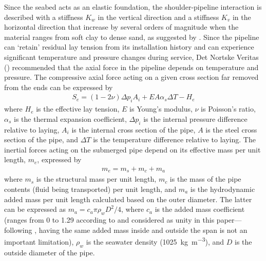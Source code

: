 \documentclass[3p,doublespacing,authoryear,11pt]{elsarticle} %
\begin{document}
Since the seabed acts as an elastic foundation, the shoulder-pipeline interaction is described with a stiffness $K_w$ in the vertical direction and a stiffness $K_v$ in the horizontal direction that increase by several orders of magnitude when the material ranges from soft clay to dense sand, as suggested by \cite{Hobbs86}. Since the pipeline can `retain' residual lay tension from its installation history and can experience significant temperature and pressure changes during service, Det Nortske Veritas (\citeyear{DNV-RP-F105,DNV-OS-F101}) recommended that the axial force in the pipeline depends on temperature and pressure. The compressive axial force acting on a given cross section far removed from the ends can be expressed by 
 \begin{equation}\label{axial_force}
 \begin{array}{l } 
\displaystyle  S_e =  (1-2 \nu) \Delta p_i A_i  + E A \alpha_s \Delta T - H_e
  \end{array}  
\end{equation}
where $H_e$ is the effective lay tension, $E$ is Young's modulus, $\nu$ is Poisson's ratio, $\alpha_s$ is the thermal expansion coefficient, $ \Delta p_i $ is the internal pressure difference relative to laying, $A_i$ is the internal cross section of the pipe,  $A$ is the steel cross section of the pipe, and $\Delta T$ is the temperature difference relative to laying. The inertial forces acting on the submerged pipe depend on its effective mass per unit length, $m_e$, expressed by
 \begin{equation}\label{effective_mass}
 \begin{array}{l } 
\displaystyle  m_e = m_s + m_c + m_a
  \end{array}  
\end{equation}
where $m_s$ is the structural mass per unit length, $m_c$ is the mass of the pipe contents (fluid being transported) per unit length, and $m_a$ is the hydrodynamic added mass per unit length calculated based on the outer diameter.  The latter can be expressed as $m_a = c_a \pi \rho_w D^2/4$, where $c_a $ is the added mass coefficient (ranges from 0 to 1.29 according to \cite{Bi:2016aa} and considered as unity in this paper---following \cite{Peek:2021vp}, having the same added mass inside and outside the span is not an important limitation), $\rho_w$ is the seawater density (\SI{1025}{\kilogram\per\meter\cubed}), and $D$ is the outside diameter of the pipe.  
\end{document}
